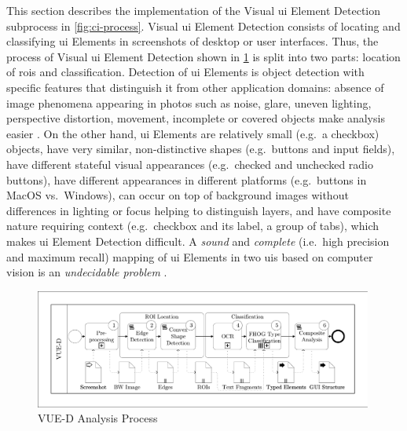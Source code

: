 This section describes the implementation of the Visual \gls{ui} Element Detection subprocess in \cref{fig:ci-process}.
Visual \gls{ui} Element Detection consists of locating and classifying \gls{ui} Elements in screenshots of \legacy desktop or \web user interfaces.
Thus, the process of Visual \gls{ui} Element Detection shown in \cref{fig:ci-vued} is split into two parts: location of \glspl{roi} and classification.
Detection of \gls{ui} Elements is object detection with specific features that distinguish it from other application domains: absence of image phenomena appearing in photos such as noise, glare, uneven lighting, perspective distortion, movement, incomplete or covered objects make analysis easier \autocite{Bakaev2019JWE}.
On the other hand, \gls{ui} Elements are relatively small (e.g.~a checkbox) objects, have very similar, non-distinctive shapes (e.g.~buttons and input fields), have different stateful visual appearances (e.g.~checked and unchecked radio buttons), have different appearances in different platforms (e.g.~buttons in MacOS vs.~Windows), can occur on top of background images without differences in lighting or focus helping to distinguish layers, and have composite nature requiring context (e.g.~checkbox and its label, a group of tabs), which makes \gls{ui} Element Detection difficult.
A \emph{sound} and \emph{complete} (i.e.~high precision and maximum recall) mapping of \gls{ui} Elements in two \glspl{ui} based on computer vision is an \emph{undecidable problem} \autocite{Grechanik2018}.

\begin{figure}[h!]
\hypertarget{fig:ci-vued}{%
\centering
\includegraphics[width=0.99\textwidth]{../figures/awsm-ci-vued.pdf}
\caption{VUE-D Analysis Process}\label{fig:ci-vued}
}
\end{figure}

